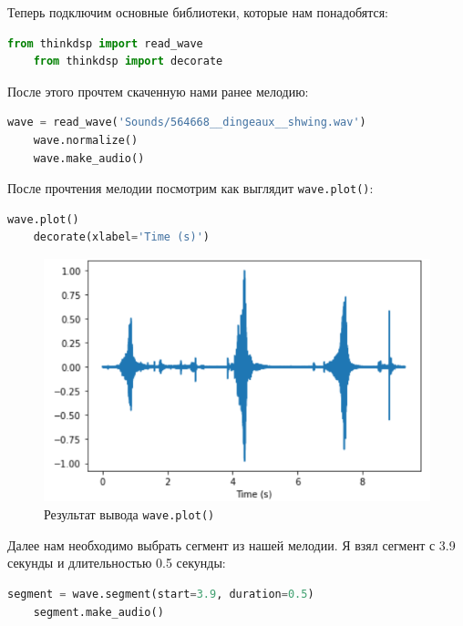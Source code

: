 \documentclass[a4paper]{article}
\begin{document}
            Теперь подключим основные библиотеки, которые нам понадобятся:
            
\begin{lstlisting}[language=Python, caption= Подключение библиотек]
    from thinkdsp import read_wave
    from thinkdsp import decorate
\end{lstlisting}
        
            После этого прочтем скаченную нами ранее мелодию:
            
\begin{lstlisting}[language=Python, caption= Прочтение скаченной мелодии]
    wave = read_wave('Sounds/564668__dingeaux__shwing.wav')
    wave.normalize()
    wave.make_audio()
\end{lstlisting}
            
            После прочтения мелодии посмотрим как выглядит \texttt{wave.plot()}:

\begin{lstlisting}[language=Python, caption= Просмотр \texttt{wave.plot()}]
    wave.plot()
    decorate(xlabel='Time (s)')
\end{lstlisting}

             \begin{figure}[H]
                \centering
                \includegraphics[width=\textwidth]{wave_plot.png}
                \caption{Результат вывода \texttt{wave.plot()}}
                \label{fig:result_output_1}
            \end{figure}
            
            Далее нам необходимо выбрать сегмент из нашей мелодии. Я взял сегмент с 3.9 секунды и длительностью 0.5 секунды:
            
\begin{lstlisting}[language=Python, caption= Выбор сегмента]
    segment = wave.segment(start=3.9, duration=0.5)
    segment.make_audio()
\end{lstlisting}
\end{document}
